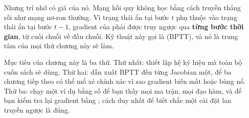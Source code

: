 Nhưng trí nhớ có giá của nó. Mạng hồi quy không học bằng cách truyền thẳng
rồi  như mạng nơ-ron thường. Vì trạng
thái ẩn tại bước $t$ phụ thuộc vào trạng thái ẩn tại bước $t-1$, gradient của
 phải
được truy ngược qua \textbf{từng bước thời gian}, từ cuối chuỗi về đầu chuỗi.
Kỹ thuật này gọi là  (BPTT), và nó là trung tâm của mọi thứ chương này sẽ làm.

Mục tiêu của chương này là ba thứ. Thứ nhất: thiết lập hệ ký hiệu mà toàn bộ
cuốn sách sẽ dùng. Thứ hai: dẫn xuất BPTT đến từng Jacobian một, để ba chương
tiếp theo có thể mổ xẻ chính xác vì sao gradient biến mất hoặc bùng nổ. Thứ
ba: chạy một ví dụ bằng số để bạn thấy mọi ma trận, mọi đạo hàm, và để bạn
kiểm tra lại gradient bằng ; cách
duy nhất để biết chắc một cài đặt lan truyền ngược là đúng.
